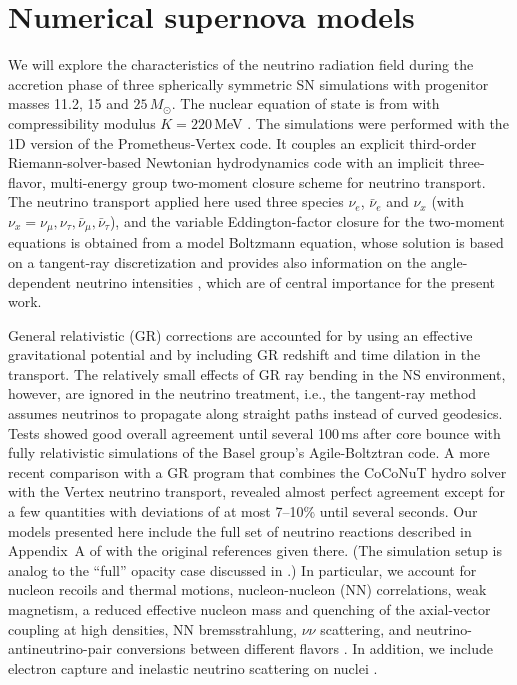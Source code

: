 \documentclass[iop,twocolappendix,numberedappendix]{emulateapj}
\begin{document}
\section{Numerical supernova models}\label{sec:SNmodels}
We will explore the characteristics of the neutrino radiation field during
the accretion phase of three spherically symmetric SN simulations with
progenitor masses 11.2, 15 and $25\,M_\odot$. The nuclear equation of state
is from \cite{Lattimer:1991nc} with compressibility modulus $K=220$\,MeV
\citep{Huedepohl:2013}. The simulations were performed with the 1D version 
of the {\sc Prometheus-Vertex} code. It couples an explicit
third-order Riemann-solver-based Newtonian hydrodynamics
code with an implicit three-flavor, multi-energy
group two-moment closure scheme for neutrino transport.
The neutrino transport applied here used three species
$\nu_e$, $\bar\nu_e$ and $\nu_x$ (with $\nu_x=\nu_\mu, \nu_\tau,
\bar{\nu}_\mu, \bar{\nu}_\tau$), and the variable Eddington-factor
closure for the two-moment equations is obtained from a
model Boltzmann equation, whose solution is based on a tangent-ray 
discretization and provides also information 
on the angle-dependent neutrino intensities \citep{RamppJanka2002}, 
which are of central importance for the present work.

General relativistic (GR) corrections are accounted for 
by using an effective gravitational potential 
\citep[case~A of][]{Mareketal2006} and by including
GR redshift and time dilation in the transport.
The relatively small effects of GR ray bending in the NS
environment, however, are ignored in the neutrino treatment,
i.e., the tangent-ray method assumes neutrinos to propagate along
straight paths instead of curved geodesics. 
Tests showed good overall agreement until several 100\,ms after
core bounce \citep{Mareketal2006,Liebendoerferetal2005}
with fully relativistic simulations of the Basel group's
{\sc Agile-Boltztran} code. A more recent comparison with
a GR program \citep{Muelleretal2010}
that combines the {\sc CoCoNuT} hydro solver
\citep{Dimmelmeieretal2002}
with the {\sc Vertex} neutrino transport, revealed
almost perfect agreement except for a few quantities with
deviations of at most 7--10$\%$ until several seconds. 
Our models presented here include the full set of
neutrino reactions described in Appendix~A of 
\cite{Burasetal2006} with the original references given there.
(The simulation setup is analog to the ``full'' opacity
case discussed in \citealt{Huedepohl:2009wh}.)
In particular, we account for
nucleon recoils and thermal motions, nucleon-nucleon
(NN) correlations, weak magnetism, a reduced effective
nucleon mass and quenching of the axial-vector coupling
at high densities, NN bremsstrahlung, $\nu\nu$ scattering, and
neutrino-antineutrino-pair conversions between different
flavors \citep{Burasetal2003}. In addition, we include electron capture
and inelastic neutrino scattering on nuclei 
\citep{Langankeetal2003,Langankeetal2008}.
\end{document}
